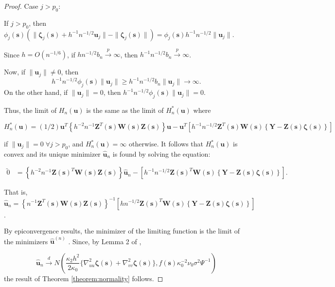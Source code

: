 \documentclass[12pt,english,authoryear, review]{article}\usepackage[]{graphicx}\usepackage[]{color}
\theoremstyle{plain}
\theoremstyle{plain}
\begin{document}
\begin{proof}
Case $j>p_{0}$:

If $j>p_{0}$, then $\phi_{j}(\bm{s})\left(\|\bm{\zeta}_{j}(\bm{s})+h^{-1}n^{-1/2}\bm{u}_{j}\|-\|\bm{\zeta}_{j}(\bm{s})\|\right)=\phi_{j}(\bm{s})h^{-1}n^{-1/2}\|\bm{u}_{j}\|$.

Since $h=O(n^{-1/6})$, if $hn^{-1/2}b_{n}\xrightarrow{p}\infty$,
then $h^{-1}n^{-1/2}b_{n}\xrightarrow{p}\infty$.

Now, if $\|\bm{u}_{j}\|\ne0$, then 
\[
h^{-1}n^{-1/2}\phi_{j}(\bm{s})\|\bm{u}_{j}\|\ge h^{-1}n^{-1/2}b_{n}\|\bm{u}_{j}\|\to\infty.
\]
On the other hand, if $\|\bm{u}_{j}\|=0$, then $h^{-1}n^{-1/2}\phi_{j}(\bm{s})\|\bm{u}_{j}\|=0$.

Thus, the limit of $H_{n}\left(\bm{u}\right)$ is the same as the
limit of $H_{n}^{*}\left(\bm{u}\right)$ where

\[
H_{n}^{*}\left(\bm{u}\right)=(1/2)\bm{u}^{T}\left\{ h^{-2}n^{-1}\bm{Z}^{T}(\bm{s})\bm{W}(\bm{s})\bm{Z}(\bm{s})\right\} \bm{u}-\bm{u}^{T}\left[h^{-1}n^{-1/2}\bm{Z}^{T}(\bm{s})\bm{W}(\bm{s})\left\{ \bm{Y}-\bm{Z}(\bm{s})\bm{\zeta}(\bm{s})\right\} \right]
\]


if $\|\bm{u}_{j}\|=0\;\forall j>p_{0}$, and $H_{n}^{*}\left(\bm{u}\right)=\infty$
otherwise. It follows that $H_{n}^{*}\left(\bm{u}\right)$ is convex
and its unique minimizer $\hat{\bm{u}}_{n}$ is found by solving the
equation:

\begin{align}
\utilde{0} & =\left\{ h^{-2}n^{-1}\bm{Z}\left(\bm{s}\right)^{T}\bm{W}\left(\bm{s}\right)\bm{Z}\left(\bm{s}\right)\right\} \hat{\bm{u}}_{n}-\left[h^{-1}n^{-1/2}\bm{Z}\left(\bm{s}\right)^{T}\bm{W}\left(\bm{s}\right)\left\{ \bm{Y}-\bm{Z}\left(\bm{s}\right)\bm{\zeta}\left(\bm{s}\right)\right\} \right].\label{eq:limit}
\end{align}


That is, $\hat{\bm{u}}_{n}=\left\{ n^{-1}\bm{Z}^{T}\left(\bm{s}\right)\bm{W}\left(\bm{s}\right)\bm{Z}\left(\bm{s}\right)\right\} ^{-1}\left[hn^{-1/2}\bm{Z}\left(\bm{s}\right)^{T}\bm{W}\left(\bm{s}\right)\left\{ \bm{Y}-\bm{Z}\left(\bm{s}\right)\bm{\zeta}\left(\bm{s}\right)\right\} \right]$.

By epiconvergence results, the minimizer of the limiting function
is the limit of the minimizers $\hat{\bm{u}}^{(n)}$ \citep{Geyer-1994,Knight-Fu-2000}.
Since, by Lemma 2 of \citet{Sun-Yan-Zhang-Lu-2014},

\begin{equation}
\hat{\bm{u}}_{n}\xrightarrow{d}N\left(\frac{\kappa_{2}h^{2}}{2\kappa_{0}}\{\nabla_{uu}^{2}\bm{\zeta}(\bm{s})+\nabla_{vv}^{2}\bm{\zeta}(\bm{s})\},f(\bm{s})\kappa_{0}^{-2}\nu_{0}\sigma^{2}\Psi^{-1}\right)
\end{equation}
the result of Theorem \ref{theorem:normality} follows.
\end{proof}
\end{document}
